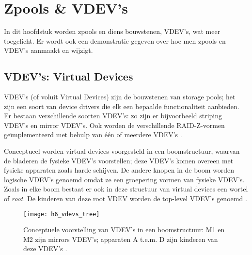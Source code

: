 

\chapter{Zpools \& VDEV's}
\label{ch:h6}

In dit hoofdstuk worden zpools en diens bouwstenen, VDEV's, wat meer toegelicht. Er wordt ook een demonstratie gegeven over hoe men zpools en VDEV's aanmaakt en wijzigt.

\section{VDEV's: Virtual Devices}

VDEV's (of voluit Virtual Devices) zijn de bouwstenen van storage pools; het zijn een soort van device drivers die elk een bepaalde functionaliteit aanbieden. Er bestaan verschillende soorten VDEV's: zo zijn er bijvoorbeeld striping VDEV's en mirror VDEV's. Ook worden de verschillende RAID-Z-vormen geïmplementeerd met behulp van één of meerdere VDEV's \autocite{ZFSBonwick}.

Conceptueel worden virtual devices voorgesteld in een boomstructuur, waarvan de bladeren de fysieke VDEV's voorstellen; deze VDEV's komen overeen met fysieke apparaten zoals harde schijven. De andere knopen in de boom worden logische VDEV's genoemd omdat ze een groepering vormen van fysieke VDEV's. Zoals in elke boom bestaat er ook in deze structuur van virtual devices een wortel of \textit{root}. De kinderen van deze root VDEV worden de top-level VDEV's genoemd \autocite{Microsystems2006}.

\begin{figure}
  \centering
  \texttt{[image: h6\_vdevs\_tree]}
  \caption{Conceptuele voorstelling van VDEV's in een boomstructuur: M1 en M2 zijn mirrors VDEV's; apparaten A t.e.m. D zijn kinderen van deze VDEV's \autocite{Microsystems2006}.}
  \label{fig:vdevs_boom}
\end{figure}

\lipsum[3-56]
